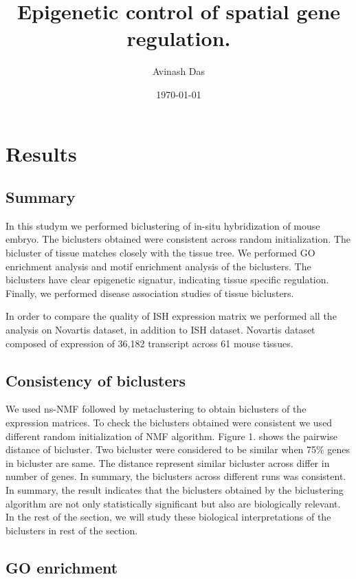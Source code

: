 \documentclass{article}
\title{
Epigenetic control of spatial gene regulation. 
}
\author{Avinash Das}
\date{\today}
\begin{document}
\pagestyle{fancy}

\maketitle
\section{Results}
\subsection{Summary}
In this studym we performed biclustering of in-situ hybridization of mouse embryo. The biclusters obtained were consistent across random initialization.
The bicluster of tissue matches closely with the tissue tree. We performed GO enrichment analysis and motif enrichment analysis of the biclusters. The
biclusters have clear epigenetic signatur, indicating tissue specific regulation. Finally, we performed disease association studies of tissue biclusters.

In order to compare the quality of ISH expression matrix we performed all the analysis on Novartis dataset, in addition to ISH dataset. Novartis
dataset composed of expression of 36,182 transcript across 61 mouse tissues. 

\subsection{Consistency of biclusters}
We used ns-NMF followed by metaclustering to obtain biclusters of the expression matrices. 
To check the biclusters obtained were consistent we used different random initialization of NMF algorithm. Figure 1. shows the pairwise distance of 
bicluster. Two bicluster were considered to be similar when 75\% genes in bicluster are same. The distance represent similar bicluster across differ 
in number of genes. In summary, the biclusters across different runs was consistent. 
In summary, the result indicates that the biclusters obtained by the biclustering
algorithm are not only statistically significant but also are biologically relevant. In the rest of the section, we will study these biological 
interpretations of the biclusters in rest of the section. 
\subsection{GO enrichment}
\end{document}
